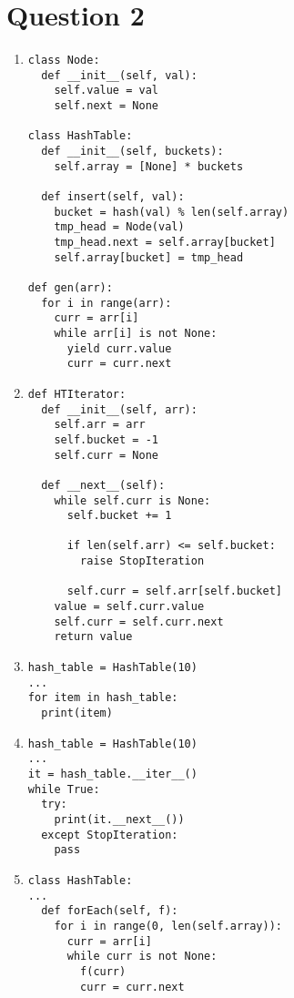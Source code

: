 \documentclass[13pt]{article}
\begin{document}
\section*{Question 2}
\begin{enumerate}[label=(\alph*)]
\item
\begin{verbatim}
class Node:
  def __init__(self, val):
    self.value = val
    self.next = None

class HashTable:
  def __init__(self, buckets):
    self.array = [None] * buckets

  def insert(self, val):
    bucket = hash(val) % len(self.array)
    tmp_head = Node(val)
    tmp_head.next = self.array[bucket]
    self.array[bucket] = tmp_head

def gen(arr):
  for i in range(arr):
    curr = arr[i]
    while arr[i] is not None:
      yield curr.value
      curr = curr.next
\end{verbatim}

\item
\begin{verbatim}
def HTIterator:
  def __init__(self, arr):
    self.arr = arr
    self.bucket = -1
    self.curr = None

  def __next__(self):
    while self.curr is None:
      self.bucket += 1

      if len(self.arr) <= self.bucket:
        raise StopIteration

      self.curr = self.arr[self.bucket]
    value = self.curr.value
    self.curr = self.curr.next
    return value
\end{verbatim}

\item
\begin{verbatim}
hash_table = HashTable(10)
...
for item in hash_table:
  print(item)
\end{verbatim}

\item
\begin{verbatim}
hash_table = HashTable(10)
...
it = hash_table.__iter__()
while True:
  try:
    print(it.__next__())
  except StopIteration:
    pass
\end{verbatim}

\item
\begin{verbatim}
class HashTable:
...
  def forEach(self, f):
    for i in range(0, len(self.array)):
      curr = arr[i]
      while curr is not None:
        f(curr)
        curr = curr.next
\end{verbatim}
\end{enumerate}
\end{document}
